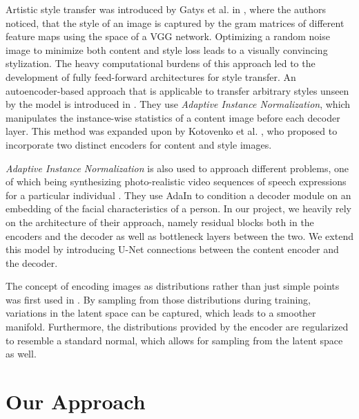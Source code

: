 \documentclass[10pt,twocolumn,letterpaper]{article}
\begin{document}
Artistic style transfer was introduced by Gatys et al. in \cite{gatys}, where the authors noticed, that the style of an image is captured by the gram matrices of different feature maps using the space of a VGG network.   Optimizing a random noise image to minimize both content and style loss leads to a visually convincing stylization. The heavy computational burdens of this approach led to the development of fully feed-forward architectures for style transfer. An autoencoder-based approach that is applicable to transfer arbitrary styles unseen by the model is introduced in \cite{adain}. They use \textit{Adaptive Instance Normalization}, which manipulates the instance-wise statistics of a content image before each decoder layer. This method was expanded upon by Kotovenko et al. \cite{disentanglement}, who proposed to incorporate two distinct encoders for content and style images.

\textit{Adaptive Instance Normalization} is also used to approach different problems, one of which being synthesizing photo-realistic video sequences of speech expressions for a particular individual \cite{talkingheads}. They use AdaIn to condition a decoder module on an embedding of the facial characteristics of a person. In our project, we heavily rely on the architecture of their approach, namely residual blocks both in the encoders and the decoder as well as bottleneck layers between the two. We extend this model by introducing U-Net \cite{unet} connections between the content encoder and the decoder.

The concept of encoding images as distributions rather than just simple points was first used in \cite{vae}. By sampling from those distributions during training, variations in the latent space can be captured, which leads to a smoother manifold. Furthermore, the distributions provided by the encoder are regularized to resemble a standard normal, which allows for sampling from the latent space as well.


\section{Our Approach}
\end{document}
